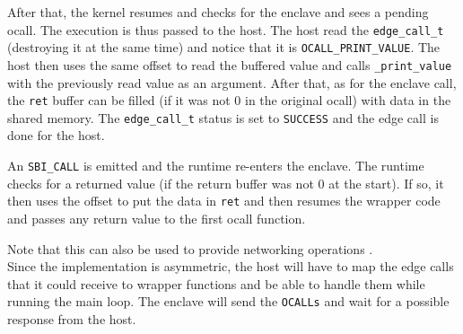 \documentclass[11pt,a4paper]{report}
\begin{document}
After that, the kernel resumes and checks for the enclave and sees a pending ocall. 
The execution is thus passed to the host.
The host read the \texttt{edge\_call\_t} (destroying it at the same time) and notice that it is \texttt{OCALL\_PRINT\_VALUE}.
The host then uses the same offset to read the buffered value and calls \texttt{\_print\_value} with the previously read value as an argument.
After that, as for the enclave call, the \texttt{ret} buffer can be filled (if it was not 0 in the original ocall) with data in the shared memory.
The \texttt{edge\_call\_t} status is set to \texttt{SUCCESS} and the edge call is done for the host.

An \texttt{SBI\_CALL} is emitted and the runtime re-enters the enclave. 
The runtime checks for a returned value (if the return buffer was not 0 at the start). 
If so, it then uses the offset to put the data in \texttt{ret} and then resumes the wrapper code and passes any return value to the first ocall function.

Note that this can also be used to provide networking operations \cite{review-keystone}.
\\

Since the implementation is asymmetric, the host will have to map the edge calls that it could receive to wrapper functions and be able to handle them while running the main loop.
The enclave will send the \verb|OCALLs| and wait for a possible response from the host.
\end{document}
